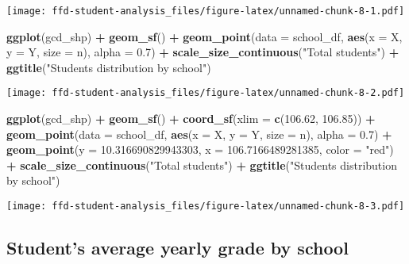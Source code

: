 \documentclass[
]{article}
\newenvironment{Shaded}{\begin{snugshade}}{\end{snugshade}}
\newcommand{\AttributeTok}[1]{\textcolor[rgb]{0.13,0.29,0.53}{#1}}
\newcommand{\FloatTok}[1]{\textcolor[rgb]{0.00,0.00,0.81}{#1}}
\newcommand{\FunctionTok}[1]{\textcolor[rgb]{0.13,0.29,0.53}{\textbf{#1}}}
\newcommand{\NormalTok}[1]{#1}
\newcommand{\SpecialCharTok}[1]{\textcolor[rgb]{0.81,0.36,0.00}{\textbf{#1}}}
\newcommand{\StringTok}[1]{\textcolor[rgb]{0.31,0.60,0.02}{#1}}
\begin{document}
\texttt{[image: ffd-student-analysis\_files/figure-latex/unnamed-chunk-8-1.pdf]}

\begin{Shaded}
\begin{Highlighting}[]
\FunctionTok{ggplot}\NormalTok{(gcd\_shp) }\SpecialCharTok{+}
  \FunctionTok{geom\_sf}\NormalTok{() }\SpecialCharTok{+}
  \FunctionTok{geom\_point}\NormalTok{(}\AttributeTok{data =}\NormalTok{ school\_df, }\FunctionTok{aes}\NormalTok{(}\AttributeTok{x =}\NormalTok{ X, }\AttributeTok{y =}\NormalTok{ Y, }\AttributeTok{size =}\NormalTok{ n), }\AttributeTok{alpha =} \FloatTok{0.7}\NormalTok{) }\SpecialCharTok{+} 
  \FunctionTok{scale\_size\_continuous}\NormalTok{(}\StringTok{"Total students"}\NormalTok{) }\SpecialCharTok{+} 
  \FunctionTok{ggtitle}\NormalTok{(}\StringTok{"Student\textquotesingle{}s distribution by school"}\NormalTok{)}
\end{Highlighting}
\end{Shaded}

\texttt{[image: ffd-student-analysis\_files/figure-latex/unnamed-chunk-8-2.pdf]}

\begin{Shaded}
\begin{Highlighting}[]
\FunctionTok{ggplot}\NormalTok{(gcd\_shp) }\SpecialCharTok{+}
  \FunctionTok{geom\_sf}\NormalTok{() }\SpecialCharTok{+}
  \FunctionTok{coord\_sf}\NormalTok{(}\AttributeTok{xlim =} \FunctionTok{c}\NormalTok{(}\FloatTok{106.62}\NormalTok{, }\FloatTok{106.85}\NormalTok{)) }\SpecialCharTok{+}
  \FunctionTok{geom\_point}\NormalTok{(}\AttributeTok{data =}\NormalTok{ school\_df, }\FunctionTok{aes}\NormalTok{(}\AttributeTok{x =}\NormalTok{ X, }\AttributeTok{y =}\NormalTok{ Y, }\AttributeTok{size =}\NormalTok{ n), }\AttributeTok{alpha =} \FloatTok{0.7}\NormalTok{) }\SpecialCharTok{+}
  \FunctionTok{geom\_point}\NormalTok{(}\AttributeTok{y =} \FloatTok{10.316690829943303}\NormalTok{, }\AttributeTok{x =} \FloatTok{106.7166489281385}\NormalTok{, }\AttributeTok{color =} \StringTok{"red"}\NormalTok{) }\SpecialCharTok{+} 
  \FunctionTok{scale\_size\_continuous}\NormalTok{(}\StringTok{"Total students"}\NormalTok{) }\SpecialCharTok{+} 
  \FunctionTok{ggtitle}\NormalTok{(}\StringTok{"Student\textquotesingle{}s distribution by school"}\NormalTok{)}
\end{Highlighting}
\end{Shaded}

\texttt{[image: ffd-student-analysis\_files/figure-latex/unnamed-chunk-8-3.pdf]}

\hypertarget{students-average-yearly-grade-by-school}{%
\subsection{Student's average yearly grade by
school}\label{students-average-yearly-grade-by-school}}
\end{document}
